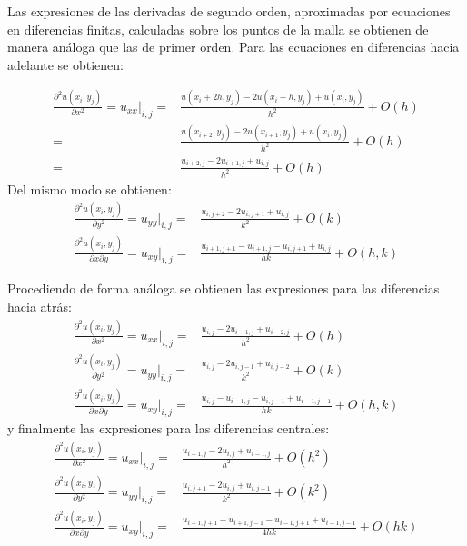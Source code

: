 Las expresiones de las derivadas de segundo orden, aproximadas por ecuaciones en diferencias finitas, calculadas sobre los puntos de la malla se obtienen de manera análoga que las de primer orden. Para las ecuaciones en diferencias hacia adelante se obtienen:

\begin{align*}
 \frac{\partial^2 u(x_i, y_j)}{\partial x^2} = u_{xx} \Bigr|_{i,j} =& \frac{u(x_i+2h,y_j) - 2u(x_i+h, y_j) + u(x_i, y_j)}{h^2} + O(h) \\
 =& \frac{u(x_{i+2}, y_j)-2u(x_{i+1},y_j)+u(x_i, y_j)}{h^2} + O(h) \\
 =& \frac{u_{i+2,j}-2u_{i+1,j}+u_{i,j}}{h^2} + O(h)
\end{align*}
Del mismo modo se obtienen:
\begin{align*}
 \frac{\partial^2u(x_i, y_j)}{\partial y^2} = u_{yy} \Bigr|_{i,j} =& \frac{u_{i,j+2}-2u_{i, j+1}+u_{i,j}}{k^2} + O(k) \\
 \frac{\partial^2u(x_i, y_j)}{\partial x \partial y} = u_{xy} \Bigr|_{i,j} =& \frac{u_{i+1, j+1} - u_{i+1, j} - u_{i, j+1} + u_{i,j}}{hk} + O(h,k)
\end{align*}

Procediendo de forma análoga se obtienen las expresiones para las diferencias hacia atrás:
\begin{align*}
 \frac{\partial^2 u(x_i, y_j)}{\partial x^2} = u_{xx} \Bigr|_{i,j} =& \frac{u_{i,j} - 2 u_{i-1,j} + u_{i-2,j}}{h^2} + O(h) \\
 \frac{\partial^2u(x_i, y_j)}{\partial y^2} = u_{yy} \Bigr|_{i,j} =& \frac{u_{i,j}- 2 u_{i, j-1} + u_{i,j-2}}{k^2} + O(k) \\
 \frac{\partial^2u(x_i, y_j)}{\partial x \partial y} = u_{xy} \Bigr|_{i,j} =& \frac{u_{i, j} - u_{i-1, j} - u_{i, j-1} + u_{i-1,j-1}}{hk} + O(h,k)
\end{align*}
y finalmente las expresiones para las diferencias centrales:
\begin{align*}
 \frac{\partial^2 u(x_i, y_j)}{\partial x^2} = u_{xx} \Bigr|_{i,j} =& \frac{u_{i+1, j} - 2 u_{i,j} + u_{i-1, j}}{h^2} + O(h^2) \\
 \frac{\partial^2u(x_i, y_j)}{\partial y^2} = u_{yy} \Bigr|_{i,j} =& \frac{u_{i,j+1} - 2 u_{i,j} + u_{i, j-1}}{k^2} + O(k^2) \\
 \frac{\partial^2u(x_i, y_j)}{\partial x \partial y} = u_{xy} \Bigr|_{i,j} =& \frac{u_{i+1, j+1} - u_{i+1, j-1} - u_{i-1, j+1} + u_{i-1, j-1}}{4hk} + O(hk)
\end{align*}

